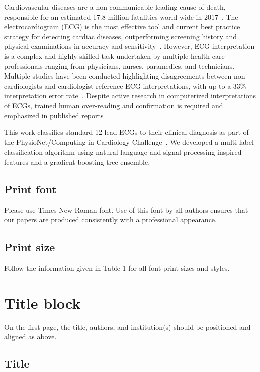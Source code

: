 \documentclass[twocolumn]{cinc}
\begin{document}
Cardiovascular diseases are a non-communicable leading cause of death, responsible for an estimated 17.8 million fatalities world wide in 2017~\cite{roth_global_2018}.
The electrocardiogram (ECG) is the most effective tool and current best practice strategy for detecting cardiac diseases, outperforming screening history and physical examinations in accuracy and sensitivity~\cite{harmon_effectiveness_2015}.
However, ECG interpretation is a complex and highly skilled task undertaken by multiple health care professionals ranging from physicians, nurses, paramedics, and technicians.
Multiple studies have been conducted highlighting disagreements between non-cardiologists and cardiologist reference ECG interpretations, with up to a 33\% interpretation error rate~\cite{mele_improving_2008}.
Despite active research in computerized interpretations of ECGs, trained human over-reading and confirmation is required and emphasized in published reports~\cite{schlapfer_computer-interpreted_2017}.

This work classifies standard 12-lead ECGs to their clinical diagnosis as part of the PhysioNet/Computing in Cardiology Challenge~\cite{physionet_challenge_2020}.
We developed a multi-label classification algorithm using natural language and signal processing inspired features and a gradient boosting tree ensemble.

\subsection{Print font}

Please use Times New Roman font. Use of this font by all authors ensures
that our papers are produced consistently with a professional appearance.


 \subsection{ Print size}  

Follow the information given in Table 1 for all font print sizes and styles.

\section{Title block}
 
On the first page, the title, authors, and institution(s) should be
positioned and aligned as above.

\subsection{Title} 
 
\end{document}
